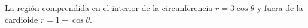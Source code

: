 \item La región comprendida en el interior de la circunferencia $r = 3 \cos \theta$ y fuera de la cardioide $r = 1 + \cos \theta$.
